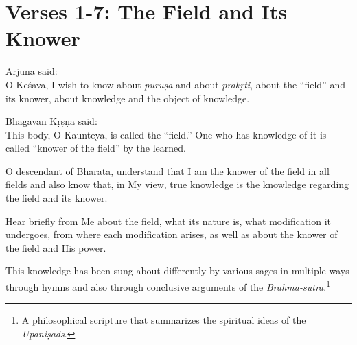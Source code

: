 \section{Verses 1-7: The Field and Its Knower}\label{sec-verses-1-7-the-field-and-its-knower}


{\hspace*{1em}Arjuna said: \\
O Keśava, I wish to know about \textit{puruṣa} and about \textit{prakṛti}, about the \enquote{field} and its knower, about knowledge and the object of knowledge.}

{\hspace*{1em}Bhagavān Kṛṣṇa said: \\
This body, O Kaunteya, is called the \enquote{field.} One who has knowledge of it is called \enquote{knower of the field} by the learned.}

{O descendant of Bharata, understand that I am the knower of the field in all fields and also know that, in My view, true knowledge is the knowledge regarding the field and its knower.}

{Hear briefly from Me about the field, what its nature is, what modification it undergoes, from where each modification arises, as well as about the knower of the field and His power.}

{This knowledge has been sung about differently by various sages in multiple ways through hymns and also through conclusive arguments of the \textit{Brahma-sūtra}.\footnote{A philosophical scripture that summarizes the spiritual ideas of the \textit{Upaniṣads}.}}

